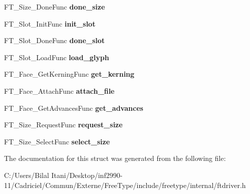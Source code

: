 \begin{DoxyCompactItemize}
\item 
F\+T\+\_\+\+Size\+\_\+\+Done\+Func {\bfseries done\+\_\+size}\hypertarget{struct_f_t___driver___class_rec___a5c96f627816a089b27bcff09f22dd1a6}{}\label{struct_f_t___driver___class_rec___a5c96f627816a089b27bcff09f22dd1a6}

\item 
F\+T\+\_\+\+Slot\+\_\+\+Init\+Func {\bfseries init\+\_\+slot}\hypertarget{struct_f_t___driver___class_rec___ae4e1d4ec7bdbdee0b4a5f8fc8f113d30}{}\label{struct_f_t___driver___class_rec___ae4e1d4ec7bdbdee0b4a5f8fc8f113d30}

\item 
F\+T\+\_\+\+Slot\+\_\+\+Done\+Func {\bfseries done\+\_\+slot}\hypertarget{struct_f_t___driver___class_rec___a548a343f5921f5d341142bf3743c42d4}{}\label{struct_f_t___driver___class_rec___a548a343f5921f5d341142bf3743c42d4}

\item 
F\+T\+\_\+\+Slot\+\_\+\+Load\+Func {\bfseries load\+\_\+glyph}\hypertarget{struct_f_t___driver___class_rec___a49dbd71e64094d4d825b8b8d51dd4e47}{}\label{struct_f_t___driver___class_rec___a49dbd71e64094d4d825b8b8d51dd4e47}

\item 
F\+T\+\_\+\+Face\+\_\+\+Get\+Kerning\+Func {\bfseries get\+\_\+kerning}\hypertarget{struct_f_t___driver___class_rec___a398395bfdbef65a8d531724d200ed91c}{}\label{struct_f_t___driver___class_rec___a398395bfdbef65a8d531724d200ed91c}

\item 
F\+T\+\_\+\+Face\+\_\+\+Attach\+Func {\bfseries attach\+\_\+file}\hypertarget{struct_f_t___driver___class_rec___a9caec9ae56a4bab9c90cede699279f29}{}\label{struct_f_t___driver___class_rec___a9caec9ae56a4bab9c90cede699279f29}

\item 
F\+T\+\_\+\+Face\+\_\+\+Get\+Advances\+Func {\bfseries get\+\_\+advances}\hypertarget{struct_f_t___driver___class_rec___aad560cd145b6d7cab7eae79194b1d724}{}\label{struct_f_t___driver___class_rec___aad560cd145b6d7cab7eae79194b1d724}

\item 
F\+T\+\_\+\+Size\+\_\+\+Request\+Func {\bfseries request\+\_\+size}\hypertarget{struct_f_t___driver___class_rec___a03ff7c2e4a2fb6d08eb481b03a78e8de}{}\label{struct_f_t___driver___class_rec___a03ff7c2e4a2fb6d08eb481b03a78e8de}

\item 
F\+T\+\_\+\+Size\+\_\+\+Select\+Func {\bfseries select\+\_\+size}\hypertarget{struct_f_t___driver___class_rec___a1b365eb82525dae0a816974d949fe0dd}{}\label{struct_f_t___driver___class_rec___a1b365eb82525dae0a816974d949fe0dd}

\end{DoxyCompactItemize}


The documentation for this struct was generated from the following file\+:\begin{DoxyCompactItemize}
\item 
C\+:/\+Users/\+Bilal Itani/\+Desktop/inf2990-\/11/\+Cadriciel/\+Commun/\+Externe/\+Free\+Type/include/freetype/internal/ftdriver.\+h\end{DoxyCompactItemize}
